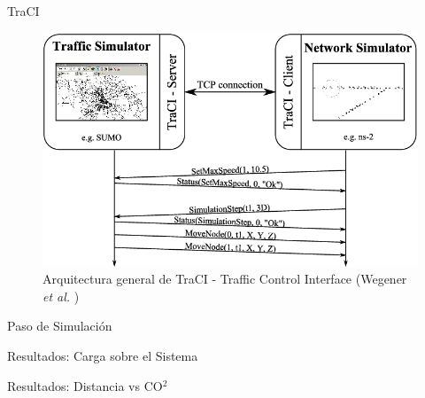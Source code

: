 \documentclass[aspectratio=169]{beamer}
\begin{document}
\begin{frame}{TraCI}
\begin{figure}
    \centering
    \includegraphics[width=.7\linewidth]{figuras/traci-arch.png}
    \caption{Arquitectura general de TraCI - Traffic Control Interface (Wegener \emph{et al.} \autocite{traci})}
    \label{fig:traci}
\end{figure}
\end{frame}

\begin{frame}{Paso de Simulación}
\begin{figure}
    \centering
\end{figure}
\end{frame}

\begin{frame}{Resultados: Carga sobre el Sistema}
\begin{figure}
    \centering
    \renewcommand{\figurewidth}{\linewidth}
    \renewcommand{\figureheight}{180}
    
\end{figure}
\end{frame}

\begin{frame}{Resultados: Distancia vs CO$^2$}
\begin{figure}
    \centering
    \renewcommand{\figurewidth}{\linewidth}
    \renewcommand{\figureheight}{165}
    
\end{figure}
\end{frame}
\end{document}
